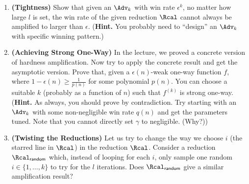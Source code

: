 \begin{problem}
\begin{enumerate}[label=(\roman*)]
    \item \textbf{(Tightness)} Show that given an $\Adv_k$ with win rate $\epsilon^k$, no matter how large $l$ is set, the win rate of the given reduction $\Rcal$ cannot always be amplified to larger than $\epsilon$. (\textbf{Hint.} You probably need to ``design'' an $\Adv_k$ with specific winning pattern.)
    \item \textbf{(Achieving Strong One-Way)} In the lecture, we proved a concrete version of hardness amplification. Now try to apply the concrete result and get the asymptotic version. Prove that, given a $\epsilon(n)$-weak one-way function $f$, where $1-\epsilon(n) \ge \frac{1}{p(n)}$ for some polynomial $p(n)$. You can choose a suitable $k$ (probably as a function of $n$) such that $f^{(k)}$ is strong one-way. (\textbf{Hint.} As always, you should prove by contradiction. Try starting with an $\Adv_k$ with some non-negligible win rate $q(n)$ and get the parameters tuned. Note that you cannot directly set $\gamma$ to negligible. (Why?))
    \item \textbf{(Twisting the Reductions)} Let us try to change the way we choose $i$ (the starred line in $\Rcal$) in the reduction $\Rcal$. Consider a reduction $\Rcal_{\textsf{random}}$ which, instead of looping for each $i$, only sample one random $i \in \{1,\ldots,k\}$ to try for the $l$ iterations. Does $\Rcal_{\textsf{random}}$ give a similar amplification result?
\end{enumerate}
\end{problem}

